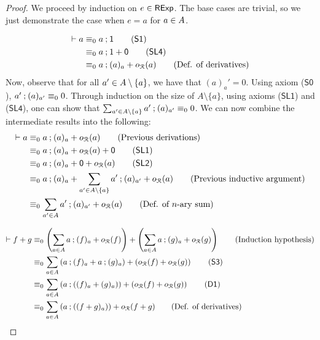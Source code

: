 \begin{proof}
We proceed by induction on $e \in \mathsf{RExp}$. The base cases are trivial, so we just demonstrate the case when $e = a$ for $a \in {A}$. 

    \begin{align*}
       \vdash a &\equiv_{0} a \seq \one \tag{$\mathsf{S1}$}\\
        &\equiv_0 a \seq 1 + \zero \tag{$\mathsf{SL4}$}\\
        &\equiv_0 a \seq (a)_a + o_{\mathcal{R}}(a) \tag{Def. of derivatives}
    \end{align*}
    Now, observe that for all $a' \in {A} \setminus \{a\}$, we have that $(a)_a' = 0$. Using axiom ($\mathsf{S0}$), $a' \mathbin{;} (a)_{a'} \equiv_0 0$. Through induction on the size of $A \setminus \{a\}$, using axioms ($\mathsf{SL1}$) and ($\mathsf{SL4}$), one can show that $\sum_{a' \in {A} \setminus \{a \}} a' \mathbin{;} (a)_{a'} \equiv_0 0$. We can now combine the intermediate results into the following:
    \begin{align*}
       \vdash a &\equiv_0 a \seq (a)_a + o_{\mathcal{R}}(a) \tag{Previous derivations} \\
        &\equiv_0  a \seq (a)_a + o_{\mathcal{R}}(a) + \zero \tag{$\mathsf{SL1}$} \\
        &\equiv_0 a \seq (a)_a + \zero + o_{\mathcal{R}}(a) \tag{$\mathsf{SL2}$} \\
        &\equiv_0 a \seq (a)_a + \sum_{a' \in \alphabet \setminus \{a\}} a' \seq (a)_{a'} + o_{\mathcal{R}}(a) \tag{Previous inductive argument} \\
        &\equiv_0 \sum_{a' \in \alphabet} a' \seq (a)_{a'} + o_{\mathcal{R}}(a) \tag{Def. of $n$-ary sum}
    \end{align*}

    \begin{align*}
        \vdash f + g &\equiv_0 \left(\sum_{a \in \alphabet} a \seq (f)_a + o_{\mathcal{R}}(f)\right) + \left(\sum_{a \in \alphabet} a \seq (g)_a + o_{\mathcal{R}}(g)\right) \tag{Induction hypothesis} \\
        &\equiv_0 \sum_{a \in \alphabet}\left( a \seq (f)_a + a \seq (g)_a\right) + \left( o_{\mathcal{R}}(f) + o_{\mathcal{R}}(g)\right) \tag{$\mathsf{S3}$}\\
        &\equiv_0 \sum_{a \in \alphabet}\left( a \seq \left((f)_a + (g)_a\right)\right) + \left( o_{\mathcal{R}}(f) + o_{\mathcal{R}}(g)\right) \tag{$\mathsf{D1}$}\\
        &\equiv_0 \sum_{a \in \alphabet}\left( a \seq \left((f + g)_a\right)\right) + o_{\mathcal{R}}(f + g)  \tag{Def. of derivatives}\\
    \end{align*}


\end{proof}
